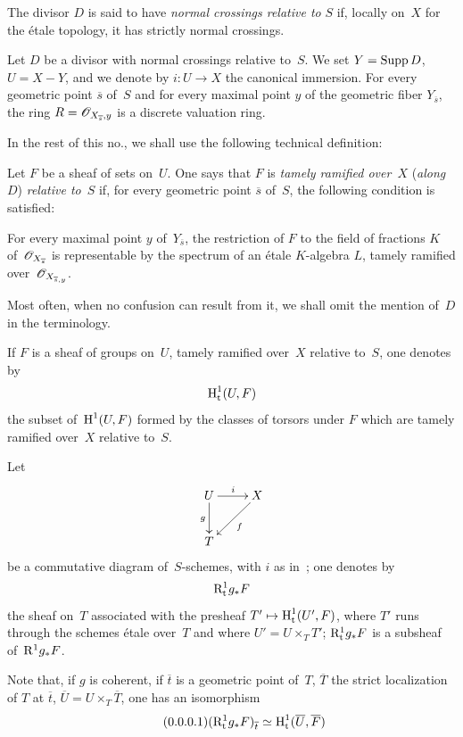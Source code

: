 The divisor $D$ is said to have \emph{normal crossings relative
to} $S$ if, locally on~$X$ for the étale topology, it has
strictly normal crossings.

Let $D$ be a divisor with normal crossings relative
to~$S$. We set $Y=\operatorname{Supp} D$, $U=X-Y$, and we denote by $i\colon U\to X$
the canonical immersion. For every geometric point
$\overline{s}$ of~$S$ and for every maximal point $y$ of the geometric
fiber $Y_{\overline{s}}$, the ring
$R=\cal{O}_{X_{\overline{s}},y}$ is a discrete valuation
ring.

In the rest of this no., we shall use the following
technical definition:

\begin{subdefinition}
\label{XIII.2.1.1}
Let $F$ be a sheaf of sets on~$U$. One says that $F$ is
\emph{tamely ramified over}~$X$
(\emph{along}~$D$) \emph{relative to}~$S$ if, for every
geometric point $\overline{s}$ of~$S$, the following condition
is satisfied:

For every maximal point $y$ of~$Y_{\overline{s}}$, the restriction of
$F$ to the field of fractions $K$ of~$\cal{O}_{X_{\overline{s}}}$ is
representable by the spectrum of an étale $K$-algebra $L$,
tamely ramified over~$\cal{O}_{X_{\overline{s},y}}$.
\end{subdefinition}

Most often, when no confusion can result from it, we
shall omit the mention of~$D$ in the terminology.

\begin{subdefinition}
\label{XIII.2.1.2}
If
$F$ is a sheaf of groups on~$U$, tamely
ramified over~$X$ relative to~$S$, one denotes by
$$
\operatorname{H}^1_{\mathrm{t}}(U,F)
$$
the subset of~$\operatorname{H}^1(U,F)$ formed by the classes of torsors under
$F$ which are tamely ramified over~$X$ relative
to~$S$.
\end{subdefinition}

Let
$$
\xymatrix{ U \ar[r]^i \ar[d]_g & X \ar[dl]^f \\ T}
$$
be a commutative diagram of~$S$-schemes, with $i$ as
in~; one denotes by
$$
\mathrm{R}^1_{\mathrm{t}} g_* F
$$
the sheaf on~$T$ associated with the presheaf
$T'\mto\H^1_{\tame}(U',F)$, where $T'$ runs through the schemes
étale over~$T$ and where $U'=U\times_T T'$; $\mathrm{R}^1_{\mathrm{t}} g_*F$
is a subsheaf of~$\mathrm{R}^1g_*F$.

Note that, if $g$ is coherent, if $\overline{t}$ is a geometric
point of~$T$, $\overline{T}$ the strict localization of
$T$ at $\overline{t}$, $\overline{U}=U\times_T\overline{T}$, one has an
isomorphism
\begin{equation*}
\label{eq:XIII.2.1.2.1}
\tag{\thesubsubsection.1} (\R^1_{\tame} g_*F)_{\overline{t}}\simeq
\H^1_{\tame}(\overline{U},\overline{F})
\end{equation*}

